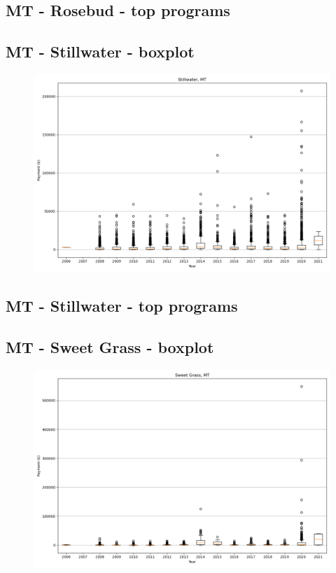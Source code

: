 \subsection*{MT - Rosebud - top programs}

\newpage
\subsection*{MT - Stillwater - boxplot}
\begin{figure}[h]
\centering
\includegraphics[width=7in]{../output/boxplots/counties/Stillwater-MT_boxplot.png}
\end{figure}


\subsection*{MT - Stillwater - top programs}

\newpage
\subsection*{MT - Sweet Grass - boxplot}
\begin{figure}[h]
\centering
\includegraphics[width=7in]{../output/boxplots/counties/Sweet Grass-MT_boxplot.png}
\end{figure}


